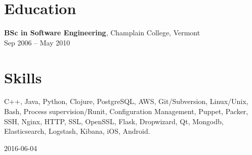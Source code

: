\documentclass{article}
\begin{document}
\section*{Education}
{\bf BSc in Software Engineering}, Champlain College, Vermont\\
Sep 2006 -- May 2010\\

\section*{Skills}
C++, Java, Python, Clojure, PostgreSQL, AWS, Git/Subversion, Linux/Unix, Bash, Process supervision/Runit, Configuration Management, Puppet, Packer, SSH, Nginx, HTTP, SSL, OpenSSL, Flask, Dropwizard, Qt, Mongodb, Elasticsearch, Logstash, Kibana, iOS, Android.\\

\begin{center}
{\small 2016-06-04}
\end{center}
\end{document}
